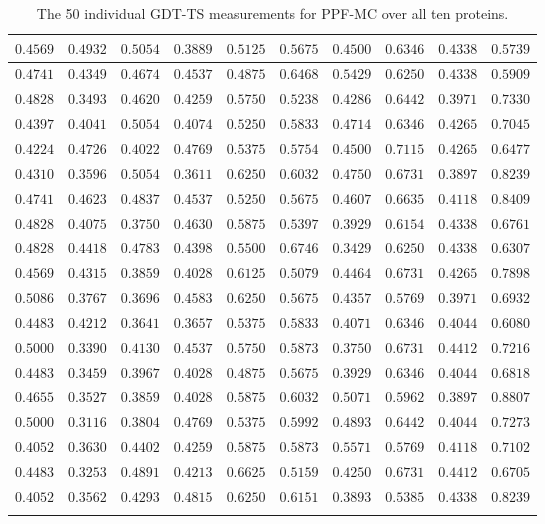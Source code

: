 \begin{longtable}{c|c|c|c|c|c|c|c|c|c}
    $0.4569$ & $0.4932$ & $0.5054$ & $0.3889$ & $0.5125$ & $0.5675$ & $0.4500$ & $0.6346$ & $0.4338$ & $0.5739$ \\ \hline
    $0.4741$ & $0.4349$ & $0.4674$ & $0.4537$ & $0.4875$ & $0.6468$ & $0.5429$ & $0.6250$ & $0.4338$ & $0.5909$ \\ \hline
    $0.4828$ & $0.3493$ & $0.4620$ & $0.4259$ & $0.5750$ & $0.5238$ & $0.4286$ & $0.6442$ & $0.3971$ & $0.7330$ \\ \hline
    $0.4397$ & $0.4041$ & $0.5054$ & $0.4074$ & $0.5250$ & $0.5833$ & $0.4714$ & $0.6346$ & $0.4265$ & $0.7045$ \\ \hline
    $0.4224$ & $0.4726$ & $0.4022$ & $0.4769$ & $0.5375$ & $0.5754$ & $0.4500$ & $0.7115$ & $0.4265$ & $0.6477$ \\ \hline
    $0.4310$ & $0.3596$ & $0.5054$ & $0.3611$ & $0.6250$ & $0.6032$ & $0.4750$ & $0.6731$ & $0.3897$ & $0.8239$ \\ \hline
    $0.4741$ & $0.4623$ & $0.4837$ & $0.4537$ & $0.5250$ & $0.5675$ & $0.4607$ & $0.6635$ & $0.4118$ & $0.8409$ \\ \hline
    $0.4828$ & $0.4075$ & $0.3750$ & $0.4630$ & $0.5875$ & $0.5397$ & $0.3929$ & $0.6154$ & $0.4338$ & $0.6761$ \\ \hline
    $0.4828$ & $0.4418$ & $0.4783$ & $0.4398$ & $0.5500$ & $0.6746$ & $0.3429$ & $0.6250$ & $0.4338$ & $0.6307$ \\ \hline
    $0.4569$ & $0.4315$ & $0.3859$ & $0.4028$ & $0.6125$ & $0.5079$ & $0.4464$ & $0.6731$ & $0.4265$ & $0.7898$ \\ \hline
    $0.5086$ & $0.3767$ & $0.3696$ & $0.4583$ & $0.6250$ & $0.5675$ & $0.4357$ & $0.5769$ & $0.3971$ & $0.6932$ \\ \hline
    $0.4483$ & $0.4212$ & $0.3641$ & $0.3657$ & $0.5375$ & $0.5833$ & $0.4071$ & $0.6346$ & $0.4044$ & $0.6080$ \\ \hline
    $0.5000$ & $0.3390$ & $0.4130$ & $0.4537$ & $0.5750$ & $0.5873$ & $0.3750$ & $0.6731$ & $0.4412$ & $0.7216$ \\ \hline
    $0.4483$ & $0.3459$ & $0.3967$ & $0.4028$ & $0.4875$ & $0.5675$ & $0.3929$ & $0.6346$ & $0.4044$ & $0.6818$ \\ \hline
    $0.4655$ & $0.3527$ & $0.3859$ & $0.4028$ & $0.5875$ & $0.6032$ & $0.5071$ & $0.5962$ & $0.3897$ & $0.8807$ \\ \hline
    $0.5000$ & $0.3116$ & $0.3804$ & $0.4769$ & $0.5375$ & $0.5992$ & $0.4893$ & $0.6442$ & $0.4044$ & $0.7273$ \\ \hline
    $0.4052$ & $0.3630$ & $0.4402$ & $0.4259$ & $0.5875$ & $0.5873$ & $0.5571$ & $0.5769$ & $0.4118$ & $0.7102$ \\ \hline
    $0.4483$ & $0.3253$ & $0.4891$ & $0.4213$ & $0.6625$ & $0.5159$ & $0.4250$ & $0.6731$ & $0.4412$ & $0.6705$ \\ \hline
    $0.4052$ & $0.3562$ & $0.4293$ & $0.4815$ & $0.6250$ & $0.6151$ & $0.3893$ & $0.5385$ & $0.4338$ & $0.8239$ \\ \hline
\caption{The 50 individual GDT-TS measurements for PPF-MC over all ten proteins.}
\end{longtable}



